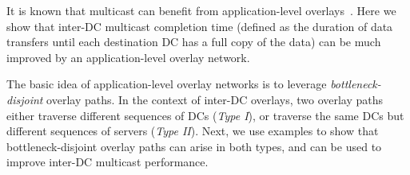It is known that multicast can
benefit from application-level overlays~\cite{chu2000case}.
Here we show that inter-DC multicast
completion time (defined as the duration of data transfers
until each destination DC has a full copy of the data)
can be much improved by an
application-level overlay network.

The basic idea of application-level overlay networks is
to leverage {\em bottleneck-disjoint} overlay paths.
In the context of inter-DC overlays, two
overlay paths either traverse different sequences of DCs ({\em Type I}), or
traverse the same DCs but different sequences of
servers ({\em Type II}).
Next, we use examples to show that bottleneck-disjoint overlay paths can arise in both types, and can be used to improve inter-DC multicast performance.

